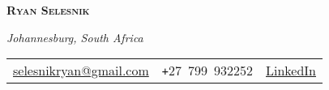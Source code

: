 \documentclass[10pt, a4paper]{article}
\begin{document}
\begin{center}
\textsc{\textbf{\huge Ryan Selesnik}}

\vspace{.2em}
\footnotesize{\textit{Johannesburg, South Africa}}
\\
\vspace{.25em}
\centering
\footnotesize{
\begin{tabular}{c|c|c}

 \href{mailto:selesnikryan@gmail.com}{selesnikryan@gmail.com}     &  \texttt{+}27~799~932252  & \href{https://www.linkedin.com/in/ryan-s-09850613b/}{LinkedIn} 
    
\end{tabular}}

\end{center}
\end{document}
